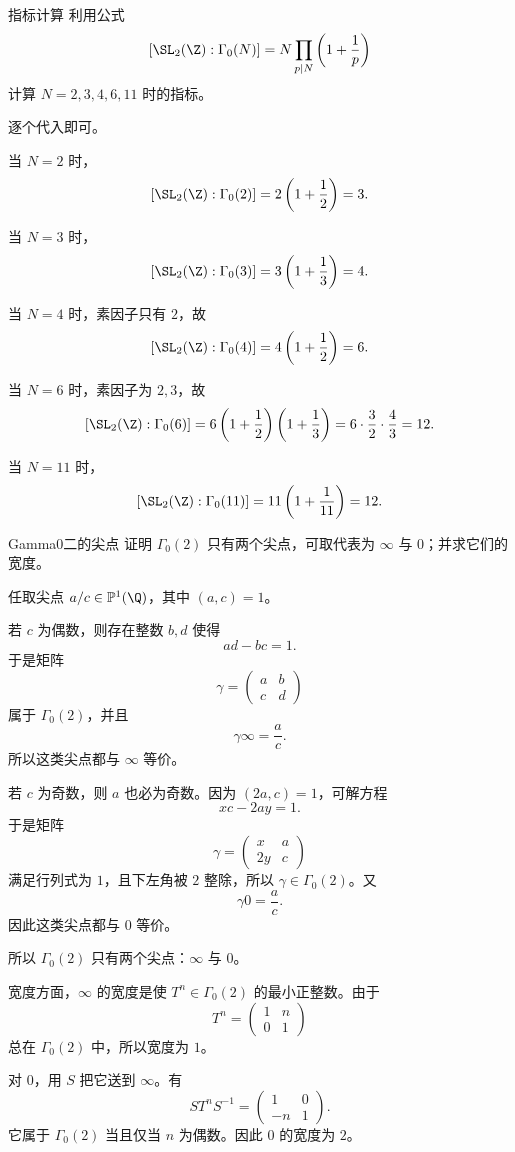 \begin{problem}{指标计算}
\medium
利用公式
\[
[\SL_2(\Z):\Gamma_0(N)]=N\prod_{p\mid N}\left(1+\frac1p\right)
\]
计算 $N=2,3,4,6,11$ 时的指标。
\end{problem}
\begin{solution}
逐个代入即可。

当 $N=2$ 时，
\[
[\SL_2(\Z):\Gamma_0(2)]=2\left(1+\frac12\right)=3.
\]

当 $N=3$ 时，
\[
[\SL_2(\Z):\Gamma_0(3)]=3\left(1+\frac13\right)=4.
\]

当 $N=4$ 时，素因子只有 $2$，故
\[
[\SL_2(\Z):\Gamma_0(4)]=4\left(1+\frac12\right)=6.
\]

当 $N=6$ 时，素因子为 $2,3$，故
\[
[\SL_2(\Z):\Gamma_0(6)]=6\left(1+\frac12\right)\left(1+\frac13\right)=6\cdot\frac32\cdot\frac43=12.
\]

当 $N=11$ 时，
\[
[\SL_2(\Z):\Gamma_0(11)]=11\left(1+\frac1{11}\right)=12.
\]
\end{solution}

\begin{problem}{Gamma0二的尖点}
\medium
证明 $\Gamma_0(2)$ 只有两个尖点，可取代表为 $\infty$ 与 $0$；并求它们的宽度。
\end{problem}
\begin{solution}
任取尖点 $a/c\in \mathbb{P}^1(\Q)$，其中 $(a,c)=1$。

若 $c$ 为偶数，则存在整数 $b,d$ 使得
\[
ad-bc=1.
\]
于是矩阵
\[
\gamma=\begin{pmatrix}a&b\\c&d\end{pmatrix}
\]
属于 $\Gamma_0(2)$，并且
\[
\gamma\infty=\frac{a}{c}.
\]
所以这类尖点都与 $\infty$ 等价。

若 $c$ 为奇数，则 $a$ 也必为奇数。因为 $(2a,c)=1$，可解方程
\[
xc-2ay=1.
\]
于是矩阵
\[
\gamma=\begin{pmatrix}x&a\\2y&c\end{pmatrix}
\]
满足行列式为 $1$，且下左角被 $2$ 整除，所以 $\gamma\in\Gamma_0(2)$。又
\[
\gamma 0=\frac{a}{c}.
\]
因此这类尖点都与 $0$ 等价。

所以 $\Gamma_0(2)$ 只有两个尖点：$\infty$ 与 $0$。

宽度方面，$\infty$ 的宽度是使 $T^n\in\Gamma_0(2)$ 的最小正整数。由于
\[
T^n=\begin{pmatrix}1&n\\0&1\end{pmatrix}
\]
总在 $\Gamma_0(2)$ 中，所以宽度为 $1$。

对 $0$，用 $S$ 把它送到 $\infty$。有
\[
ST^nS^{-1}=\begin{pmatrix}1&0\\-n&1\end{pmatrix}.
\]
它属于 $\Gamma_0(2)$ 当且仅当 $n$ 为偶数。因此 $0$ 的宽度为 $2$。
\end{solution}

